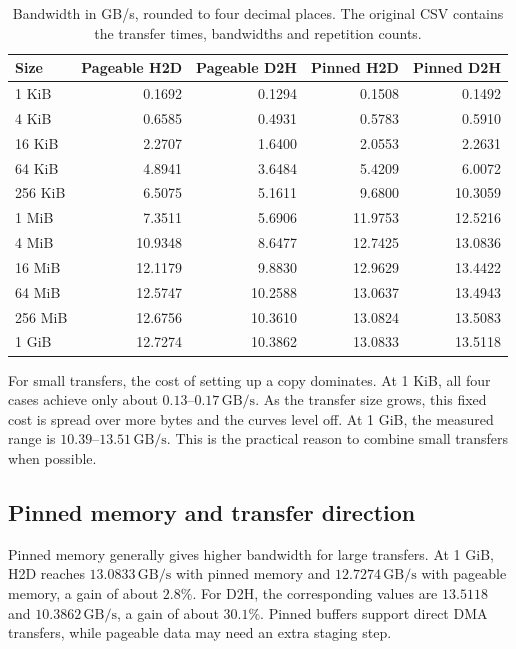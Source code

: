\documentclass[11pt,a4paper]{article}
\begin{document}
\begin{table}[!ht]
\centering
\small
\begin{tabular}{@{}lrrrr@{}}
\toprule
Size & Pageable H2D & Pageable D2H & Pinned H2D & Pinned D2H \\
\midrule
1 KiB   & 0.1692  & 0.1294  & 0.1508  & 0.1492 \\
4 KiB   & 0.6585  & 0.4931  & 0.5783  & 0.5910 \\
16 KiB  & 2.2707  & 1.6400  & 2.0553  & 2.2631 \\
64 KiB  & 4.8941  & 3.6484  & 5.4209  & 6.0072 \\
256 KiB & 6.5075  & 5.1611  & 9.6800  & 10.3059 \\
1 MiB   & 7.3511  & 5.6906  & 11.9753 & 12.5216 \\
4 MiB   & 10.9348 & 8.6477  & 12.7425 & 13.0836 \\
16 MiB  & 12.1179 & 9.8830  & 12.9629 & 13.4422 \\
64 MiB  & 12.5747 & 10.2588 & 13.0637 & 13.4943 \\
256 MiB & 12.6756 & 10.3610 & 13.0824 & 13.5083 \\
1 GiB   & 12.7274 & 10.3862 & 13.0833 & 13.5118 \\
\bottomrule
\end{tabular}
\caption{Bandwidth in GB/s, rounded to four decimal places. The original CSV
contains the transfer times, bandwidths and repetition counts.}
\label{tab:pcie}
\end{table}

For small transfers, the cost of setting up a copy dominates. At 1 KiB, all
four cases achieve only about \(0.13\)--\(0.17\,\mathrm{GB/s}\). As the
transfer size grows, this fixed cost is spread over more bytes and the curves
level off. At 1 GiB, the measured range is
\(10.39\)--\(13.51\,\mathrm{GB/s}\). This is the practical reason to combine
small transfers when possible.

\clearpage
\subsection*{Pinned memory and transfer direction}

Pinned memory generally gives higher bandwidth for large transfers. At
1 GiB, H2D reaches \(13.0833\,\mathrm{GB/s}\) with pinned memory and
\(12.7274\,\mathrm{GB/s}\) with pageable memory, a gain of about \(2.8\%\).
For D2H, the corresponding values are \(13.5118\) and
\(10.3862\,\mathrm{GB/s}\), a gain of about \(30.1\%\). Pinned buffers
support direct DMA transfers, while pageable data may need an extra staging
step.
\end{document}
